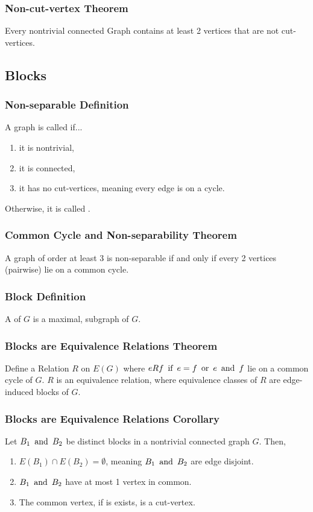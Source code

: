 \subsubsection*{Non-cut-vertex Theorem}
Every nontrivial connected Graph contains at least 2 vertices that are not cut-vertices.

\subsection{Blocks}

\subsubsection*{Non-separable Definition}
A graph is called  if...
\begin{enumerate}
    \item it is nontrivial,
    \item it is connected,
    \item it has no cut-vertices, meaning every edge is on a cycle.
\end{enumerate}
Otherwise, it is called .

\subsubsection*{Common Cycle and Non-separability Theorem}
A graph of order at least 3 is non-separable if and only if every 2 vertices (pairwise) lie on a common cycle.

\subsubsection*{Block Definition}
A  of $G$ is a maximal,  subgraph of $G$.

\subsubsection*{Blocks are Equivalence Relations Theorem}
Define a Relation $R$ on $E(G)$ where $eRf \operatorname{~\text{if}~} e=f \operatorname{~\text{or}~} e \operatorname{~\text{and}~} f$ lie on a common cycle of $G$. $R$ is an equivalence relation, where equivalence classes of $R$ are edge-induced blocks of $G$.

\subsubsection*{Blocks are Equivalence Relations Corollary}
Let $B_1 \operatorname{~\text{and}~} B_2$ be distinct blocks in a nontrivial connected graph $G$. Then,
\begin{enumerate}
    \item $E(B_1) \cap E(B_2) = \emptyset$, meaning $B_1 \operatorname{~\text{and}~} B_2$ are edge disjoint.
    \item $B_1 \operatorname{~\text{and}~} B_2$ have at most 1 vertex in common.
    \item The common vertex, if is exists, is a cut-vertex.
\end{enumerate}

